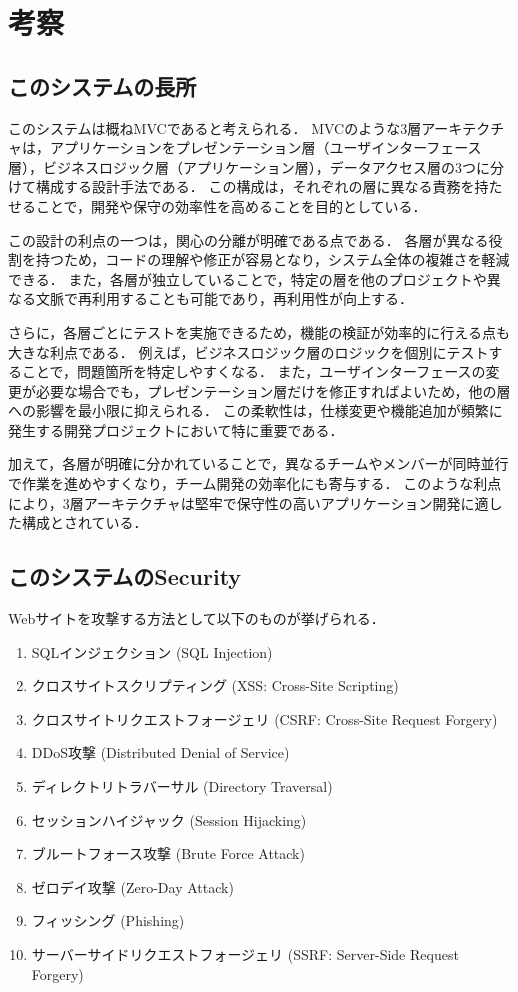 \documentclass[titlepage,a4paper]{jsarticle}
\begin{document}
\section{考察}
\subsection{このシステムの長所}
このシステムは概ねMVCであると考えられる．
MVCのような3層アーキテクチャは，アプリケーションをプレゼンテーション層（ユーザインターフェース層），ビジネスロジック層（アプリケーション層），データアクセス層の3つに分けて構成する設計手法である．
この構成は，それぞれの層に異なる責務を持たせることで，開発や保守の効率性を高めることを目的としている．

この設計の利点の一つは，関心の分離が明確である点である．
各層が異なる役割を持つため，コードの理解や修正が容易となり，システム全体の複雑さを軽減できる．
また，各層が独立していることで，特定の層を他のプロジェクトや異なる文脈で再利用することも可能であり，再利用性が向上する．

さらに，各層ごとにテストを実施できるため，機能の検証が効率的に行える点も大きな利点である．
例えば，ビジネスロジック層のロジックを個別にテストすることで，問題箇所を特定しやすくなる．
また，ユーザインターフェースの変更が必要な場合でも，プレゼンテーション層だけを修正すればよいため，他の層への影響を最小限に抑えられる．
この柔軟性は，仕様変更や機能追加が頻繁に発生する開発プロジェクトにおいて特に重要である．

加えて，各層が明確に分かれていることで，異なるチームやメンバーが同時並行で作業を進めやすくなり，チーム開発の効率化にも寄与する．
このような利点により，3層アーキテクチャは堅牢で保守性の高いアプリケーション開発に適した構成とされている．

\subsection{このシステムのSecurity}
Webサイトを攻撃する方法として以下のものが挙げられる．
\begin{enumerate}
  \item SQLインジェクション (SQL Injection)
  \item クロスサイトスクリプティング (XSS: Cross-Site Scripting)
  \item クロスサイトリクエストフォージェリ (CSRF: Cross-Site Request Forgery)
  \item DDoS攻撃 (Distributed Denial of Service)
  \item ディレクトリトラバーサル (Directory Traversal)
  \item セッションハイジャック (Session Hijacking)
  \item ブルートフォース攻撃 (Brute Force Attack)
  \item ゼロデイ攻撃 (Zero-Day Attack)
  \item フィッシング (Phishing)
  \item サーバーサイドリクエストフォージェリ (SSRF: Server-Side Request Forgery)
\end{enumerate}
\end{document}
